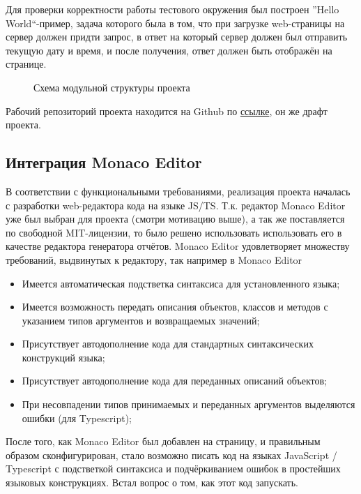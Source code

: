 \documentclass[12pt]{article}
\begin{document}
    Для проверки корректности работы тестового окружения был построен ''Hello World``-пример, задача которого была в том, что
    при загрузке web-страницы на сервер должен придти запрос, в ответ на который сервер должен был отправить текущую дату и время,
    и после получения, ответ должен быть отображён на странице.
    \begin{figure}[h]
        \caption{Схема модульной структуры проекта}
    \end{figure}

    Рабочий репозиторий проекта находится на Github по \href{https://github.com/johanDDC/report-builder}{ссылке}, он же драфт проекта.

    \subsection{Интеграция Monaco Editor}
    В соответствии с функциональными требованиями, реализация проекта началась с разработки web-редактора кода на языке JS/TS. Т.к. редактор
    Monaco Editor уже был выбран для проекта (смотри мотивацию выше), а так же поставляется по свободной MIT-лицензии, то было решено использовать
    использовать его в качестве редактора генератора отчётов. Monaco Editor удовлетворяет множеству требований, выдвинутых к редактору, так
    например в Monaco Editor
    \begin{itemize}
        \item Имеется автоматическая подстветка синтаксиса для установленного языка;
        \item Имеется возможность передать описания объектов, классов и методов с указанием типов аргументов и возвращаемых значений;
        \item Присутствует автодополнение кода для стандартных синтаксических конструкций языка;
        \item Присутствует автодополнение кода для переданных описаний объектов;
        \item При несовпадении типов принимаемых и переданных аргументов выделяются ошибки (для Typescript);
    \end{itemize}
    После того, как Monaco Editor был добавлен на страницу, и правильным образом сконфигурирован, стало возможно писать код на языках
    JavaScript / Typescript с подстветкой синтаксиса и подчёркиванием ошибок в простейших языковых конструкциях. Встал вопрос о том, как этот
    код запускать.
\end{document}
